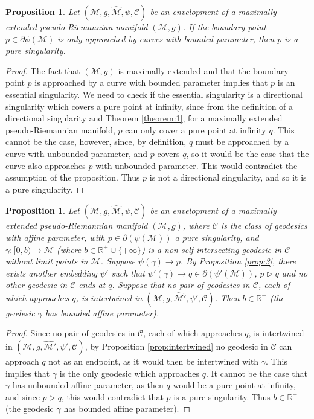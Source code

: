 \documentclass[pdflatex,sn-mathphys-num]{sn-jnl}
\newtheorem{prop}[theorem]{Proposition}
\theoremstyle{definition}
\begin{document}
\begin{prop}\label{prop:finite}
    Let $(\mathcal{M},g,\hat{\mathcal{M}},\psi,\mathcal{C})$ be an envelopment of a maximally extended pseudo-Riemannian manifold $(\mathcal{M},g)$. If the boundary point $p \in \partial\psi(\mathcal{M})$ is only approached by curves with bounded parameter, then $p$ is a pure singularity.
\end{prop}
\begin{proof}
     The fact that $(\mathcal{M},g)$ is maximally extended and that the boundary point $p$ is approached by a curve with bounded parameter implies that $p$ is an essential singularity. We need to check if the essential singularity is a directional singularity which covers a pure point at infinity, since from the definition of a directional singularity and Theorem \ref{theorem:1}, for a maximally extended pseudo-Riemannian manifold, $p$ can only cover a pure point at infinity $q$. This cannot be the case, however, since, by definition, $q$ must be approached by a curve with unbounded parameter, and $p$ covers $q$, so it would be the case that the curve also approaches $p$ with unbounded parameter. This would contradict the assumption of the proposition. Thus $p$ is not a directional singularity, and so it is a pure singularity.
\end{proof}
\begin{prop}\label{prop:main}
    Let $(\mathcal{M},g,\hat{\mathcal{M}},\psi,\mathcal{C})$ be an envelopment of a maximally extended pseudo-Riemannian manifold $(\mathcal{M},g)$, where $\mathcal{C}$ is the class of geodesics with affine parameter, with $p \in \partial(\psi(\mathcal{M}))$ a pure singularity, and $\gamma: [0,b) \rightarrow \mathcal{M}$ (where $b \in \mathbb{R}^+ \cup \{+\infty\}$) is a non-self-intersecting geodesic in $\mathcal{C}$ without limit points in $\mathcal{M}$. Suppose $\psi(\gamma) \rightarrow p$. By Proposition \ref{prop:3}, there exists another embedding $\psi'$ such that $\psi'(\gamma) \rightarrow q \in \partial(\psi'(\mathcal{M}))$, $p \vartriangleright q$ and no other geodesic in $\mathcal{C}$ ends at $q$. Suppose that no pair of geodesics in $\mathcal{C}$, each of which approaches $q$, is intertwined in $(\mathcal{M},g,\hat{\mathcal{M}}',\psi',\mathcal{C})$. Then $b \in \mathbb{R}^{+}$ (the geodesic $\gamma$ has bounded affine parameter).
\end{prop}

\begin{proof}
Since no pair of geodesics in $\mathcal{C}$, each of which approaches $q$, is intertwined in $(\mathcal{M},g,\hat{\mathcal{M}}',\psi',\mathcal{C})$, by Proposition \ref{prop:intertwined} no geodesic in $\mathcal{C}$ can approach $q$ not as an endpoint, as it would then be intertwined with $\gamma$. This implies that $\gamma$ is the only geodesic which approaches $q$. It cannot be the case that $\gamma$ has unbounded affine parameter, as then $q$ would be a pure point at infinity, and since $p \vartriangleright q$, this would contradict that $p$ is a pure singularity. Thus $b \in \mathbb{R}^{+}$ (the geodesic $\gamma$ has bounded affine parameter).
\end{proof}
\end{document}
